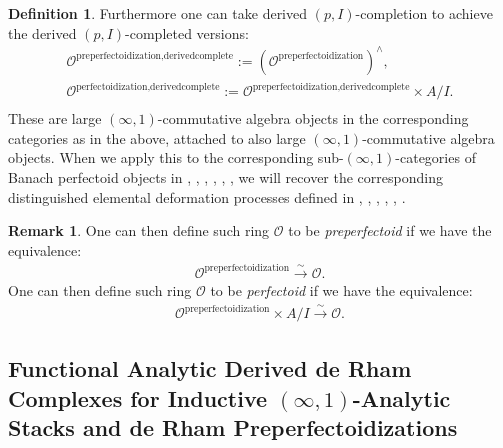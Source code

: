 \documentclass[11pt]{book}
\theoremstyle{definition}
\newtheorem{definition}[theorem]{Definition}
\newtheorem{remark}[theorem]{Remark}
\numberwithin{equation}{section}
\begin{document}
\begin{definition}
Furthermore one can take derived $(p,I)$-completion to achieve the derived $(p,I)$-completed versions:
\begin{align}
\mathcal{O}^\text{preperfectoidization,derivedcomplete}:=(\mathcal{O}^\text{preperfectoidization})^{\wedge},\\
\mathcal{O}^\text{perfectoidization,derivedcomplete}:=\mathcal{O}^\text{preperfectoidization,derivedcomplete}\times A/I.\\
\end{align}
These are large $(\infty,1)$-commutative algebra objects in the corresponding categories as in the above, attached to also large $(\infty,1)$-commutative algebra objects. When we apply this to the corresponding sub-$(\infty,1)$-categories of Banach perfectoid objects in \cite{BMS2}, \cite{GR}, \cite{12KL1}, \cite{12KL2}, \cite{12Ked1}, \cite{12Sch3},  we will recover the corresponding distinguished elemental deformation processes defined in \cite{BMS2}, \cite{GR}, \cite{12KL1}, \cite{12KL2}, \cite{12Ked1}, \cite{12Sch3}. 
\end{definition}


\begin{remark}
One can then define such ring $\mathcal{O}$ to be \textit{preperfectoid} if we have the equivalence:
\begin{align}
\mathcal{O}^{\text{preperfectoidization}} \overset{\sim}{\longrightarrow}	\mathcal{O}.
\end{align}
One can then define such ring $\mathcal{O}$ to be \textit{perfectoid} if we have the equivalence:
\begin{align}
\mathcal{O}^{\text{preperfectoidization}}\times A/I \overset{\sim}{\longrightarrow}	\mathcal{O}.
\end{align}
	
\end{remark}


\newpage

\subsection{Functional Analytic Derived de Rham Complexes for Inductive $(\infty,1)$-Analytic Stacks and de Rham Preperfectoidizations}
\end{document}
